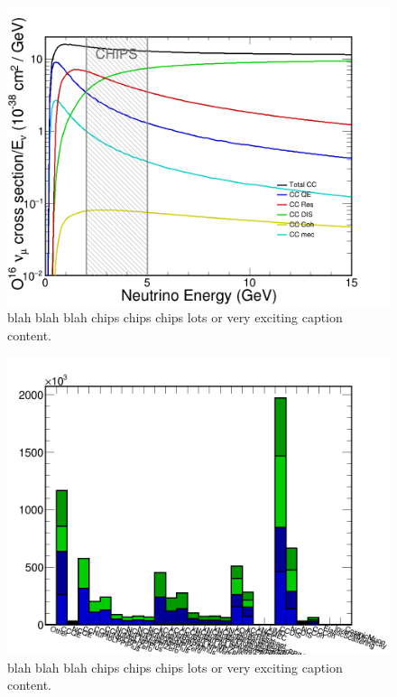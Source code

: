 \begin{figure}
    \includegraphics[width=\largefigwidth]{diagrams/cvn/xsec_cc_nu_mu_O16}
    \caption[xsec_cc_nu_mu_O16]%
    {blah blah blah chips chips chips lots or very exciting caption content.}
    \label{fig:xsec_cc_nu_mu_O16}
\end{figure}

\begin{figure}
    \includegraphics[width=\largefigwidth]{diagrams/cvn/events}
    \caption[events]%
    {blah blah blah chips chips chips lots or very exciting caption content.}
    \label{fig:events}
\end{figure}

